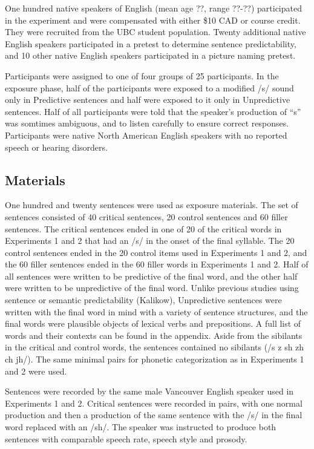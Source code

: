 One hundred native speakers of English (mean age ??, range ??-??) participated in the experiment and were compensated with either \$10 CAD or course credit. They were recruited from the UBC student population.  Twenty additional native English speakers participated in a pretest to determine sentence predictability, and 10 other native English speakers participated in a picture naming pretest.

Participants were assigned to one of four groups of 25 participants.  In the exposure phase, half of the participants were exposed to a modified /s/ sound only in Predictive sentences and half were exposed to it only in Unpredictive sentences.  Half of all participants were told that the speaker's production of ``s'' was somtimes ambiguous, and to listen carefully to ensure correct responses.  Participants were native North American English speakers with no reported speech or hearing disorders.

\subsection{Materials}

One hundred and twenty sentences were used as exposure materials.  The set of sentences consisted of 40 critical sentences, 20 control sentences and 60 filler sentences.  The critical sentences ended in one of 20 of the critical words in Experiments 1 and 2 that had an /s/ in the onset of the final syllable.  The 20 control sentences ended in the 20 control items used in Experiments 1 and 2, and the 60 filler sentences ended in the 60 filler words in Experiments 1 and 2.  Half of all sentences were written to be predictive of the final word, and the other half were written to be unpredictive of the final word.  Unlike previous studies using sentence or semantic predictability (Kalikow), Unpredictive sentences were written with the final word in mind with a variety of sentence structures, and the final words were plausible objects of lexical verbs and prepositions.  A full list of words and their contexts can be found in the appendix. Aside from the sibilants in the critical and control words, the sentences contained no sibilants (/s z sh zh ch jh/).  The same minimal pairs for phonetic categorization as in Experiments 1 and 2 were used.

Sentences were recorded by the same male Vancouver English speaker used in Experiments 1 and 2.  Critical sentences were recorded in pairs, with one normal production and then a production of the same sentence with the /s/ in the final word replaced with an /sh/.  The speaker was instructed to produce both sentences with comparable speech rate, speech style and prosody.

